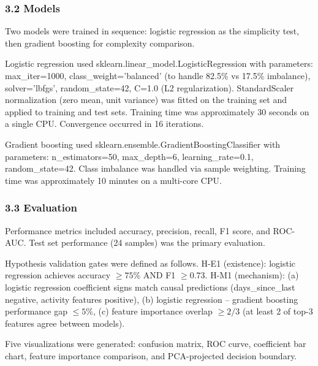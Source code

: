 \subsubsection{3.2 Models}

Two models were trained in sequence: logistic regression as the simplicity test, then gradient boosting for complexity comparison.

Logistic regression used sklearn.linear\_model.LogisticRegression with parameters: max\_iter=1000, class\_weight='balanced' (to handle 82.5\% vs 17.5\% imbalance), solver='lbfgs', random\_state=42, C=1.0 (L2 regularization). StandardScaler normalization (zero mean, unit variance) was fitted on the training set and applied to training and test sets. Training time was approximately 30 seconds on a single CPU. Convergence occurred in 16 iterations.

Gradient boosting used sklearn.ensemble.GradientBoostingClassifier with parameters: n\_estimators=50, max\_depth=6, learning\_rate=0.1, random\_state=42. Class imbalance was handled via sample weighting. Training time was approximately 10 minutes on a multi-core CPU.

\subsubsection{3.3 Evaluation}

Performance metrics included accuracy, precision, recall, F1 score, and ROC-AUC. Test set performance (24 samples) was the primary evaluation.

Hypothesis validation gates were defined as follows. H-E1 (existence): logistic regression achieves accuracy $\geq 75$\% AND F1 $\geq 0.73$. H-M1 (mechanism): (a) logistic regression coefficient signs match causal predictions (days\_since\_last negative, activity features positive), (b) logistic regression -- gradient boosting performance gap $\leq 5$\%, (c) feature importance overlap $\geq 2/3$ (at least 2 of top-3 features agree between models).

Five visualizations were generated: confusion matrix, ROC curve, coefficient bar chart, feature importance comparison, and PCA-projected decision boundary.
